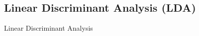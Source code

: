 \documentclass[xcolor=pdftex,dvipsnames,table]{beamer}
\begin{document}
\subsection{Linear Discriminant Analysis (LDA)}
\begin{frame}[plain,c]
\begin{center}
\Huge Linear Discriminant Analysis
\end{center}
\end{frame}






\end{document}
